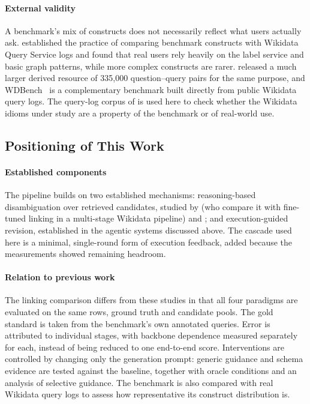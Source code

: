 \paragraph{External validity}

A benchmark's mix of constructs does not necessarily reflect what users actually ask.
\citet{malyshev2018getting} established the practice of comparing benchmark constructs with Wikidata Query Service logs and found that real users rely heavily on the label service and basic graph patterns, while more complex constructs are rarer.
\citet{walter2026wdql} released a much larger derived resource of 335,000 question--query pairs for the same purpose, and WDBench~\citep{angles2022wdbench} is a complementary benchmark built directly from public Wikidata query logs.
The query-log corpus of \citet{walter2026wdql} is used here to check whether the Wikidata idioms under study are a property of the benchmark or of real-world use.

\subsection{Positioning of This Work}

\label{sec:positioning}

\paragraph{Established components}

The pipeline builds on two established mechanisms: reasoning-based disambiguation over retrieved candidates, studied by \citet{alekseev2025querybased} (who compare it with fine-tuned linking in a multi-stage Wikidata pipeline) and \citet{vollmers2025evaluation}; and execution-guided revision, established in the agentic systems discussed above.
The cascade used here is a minimal, single-round form of execution feedback, added because the measurements showed remaining headroom.

\paragraph{Relation to previous work}

The linking comparison differs from these studies in that all four paradigms are evaluated on the same rows, ground truth and candidate pools. The gold standard is taken from the benchmark's own annotated queries.
Error is attributed to individual stages, with backbone dependence measured separately for each, instead of being reduced to one end-to-end score.
Interventions are controlled by changing only the generation prompt: generic guidance and schema evidence are tested against the baseline, together with oracle conditions and an analysis of selective guidance.
The benchmark is also compared with real Wikidata query logs to assess how representative its construct distribution is.
